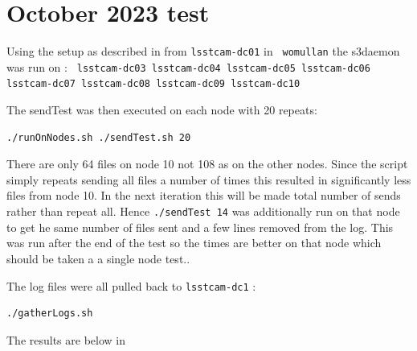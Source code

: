 \section{October 2023 test} \label{sec:oct2023}
Using the setup as described in  from {\tt lsstcam-dc01} in  {\tt ~womullan}
the s3daemon was run on : {\tt
 lsstcam-dc03 lsstcam-dc04 lsstcam-dc05 lsstcam-dc06 lsstcam-dc07 lsstcam-dc08 lsstcam-dc09 lsstcam-dc10
}

The sendTest was then executed on each node with 20 repeats:
\begin{verbatim}
./runOnNodes.sh ./sendTest.sh 20
\end{verbatim}
There are only 64 files on node 10 not 108 as on the other nodes.
Since the script simply repeats sending all files a number of times this resulted in significantly less files from node 10.
In the next iteration this will be made total number of sends rather than repeat all.
Hence {\tt ./sendTest 14} was
additionally run on that node to get he same number of files sent and a few lines removed from the log.
This was run after the end of the test so the times are better on that node which should be taken a a single node test..

The log files were all pulled back to {\tt lsstcam-dc1} :
\begin{verbatim}
./gatherLogs.sh
\end{verbatim}
The results are below in 

